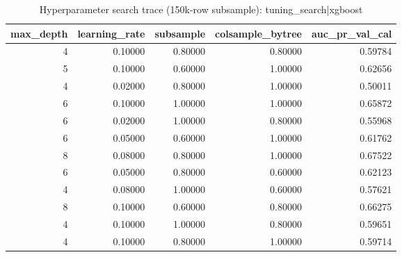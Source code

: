 \begin{table}
\caption{Hyperparameter search trace (150k-row subsample): tuning_search|xgboost}
\label{tab:table14_hp_search_xgboost}
\begin{tabular}{rrrrr}
\toprule
max\_depth & learning\_rate & subsample & colsample\_bytree & auc\_pr\_val\_cal \\
\midrule
4 & 0.10000 & 0.80000 & 0.80000 & 0.59784 \\
5 & 0.10000 & 0.60000 & 1.00000 & 0.62656 \\
4 & 0.02000 & 0.80000 & 1.00000 & 0.50011 \\
6 & 0.10000 & 1.00000 & 1.00000 & 0.65872 \\
6 & 0.02000 & 1.00000 & 0.80000 & 0.55968 \\
6 & 0.05000 & 0.60000 & 1.00000 & 0.61762 \\
8 & 0.08000 & 0.80000 & 1.00000 & 0.67522 \\
6 & 0.05000 & 0.80000 & 0.60000 & 0.62123 \\
4 & 0.08000 & 1.00000 & 0.60000 & 0.57621 \\
8 & 0.10000 & 0.60000 & 0.80000 & 0.66275 \\
4 & 0.10000 & 1.00000 & 0.80000 & 0.59651 \\
4 & 0.10000 & 0.80000 & 1.00000 & 0.59714 \\
\bottomrule
\end{tabular}
\end{table}
